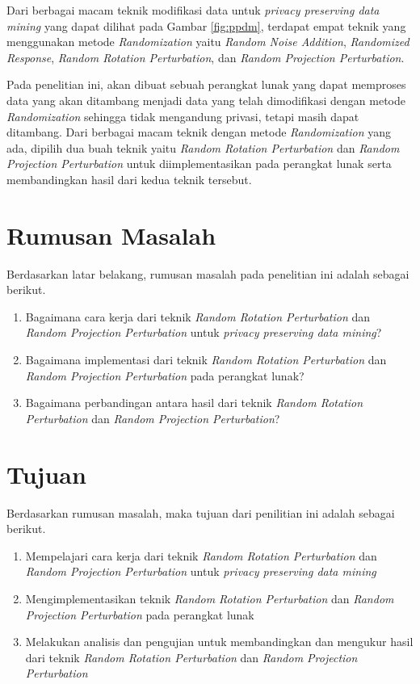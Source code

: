 Dari berbagai macam teknik modifikasi data untuk \textit{privacy preserving data mining} yang dapat dilihat pada Gambar \ref{fig:ppdm}, terdapat empat teknik yang menggunakan metode \textit{Randomization} yaitu \textit{Random Noise Addition}, \textit{Randomized Response}, \textit{Random Rotation Perturbation}, dan \textit{Random Projection Perturbation}.

Pada penelitian ini, akan dibuat sebuah perangkat lunak yang dapat memproses data yang akan ditambang menjadi data yang telah dimodifikasi dengan metode \textit{Randomization} sehingga tidak mengandung privasi, tetapi masih dapat ditambang. Dari berbagai macam teknik dengan metode \textit{Randomization} yang ada, dipilih dua buah teknik yaitu \textit{Random Rotation Perturbation} dan \textit{Random Projection Perturbation} untuk diimplementasikan pada perangkat lunak serta membandingkan hasil dari kedua teknik tersebut.

\section{Rumusan Masalah}
\label{sec:rumusan}
Berdasarkan latar belakang, rumusan masalah pada penelitian ini adalah sebagai berikut.
\begin{enumerate}
	\item Bagaimana cara kerja dari teknik \textit{Random Rotation Perturbation} dan \textit{Random Projection Perturbation} untuk \textit{privacy preserving data mining}?
	\item Bagaimana implementasi dari teknik \textit{Random Rotation Perturbation} dan \textit{Random Projection Perturbation} pada perangkat lunak?
	\item Bagaimana perbandingan antara hasil dari teknik \textit{Random Rotation Perturbation} dan \textit{Random Projection Perturbation}?
\end{enumerate}

\section{Tujuan}
\label{sec:tujuan}
Berdasarkan rumusan masalah, maka tujuan dari penilitian ini adalah sebagai berikut.
\begin{enumerate}
	\item Mempelajari cara kerja dari teknik \textit{Random Rotation Perturbation} dan \textit{Random Projection Perturbation} untuk \textit{privacy preserving data mining}
	\item Mengimplementasikan teknik \textit{Random Rotation Perturbation} dan \textit{Random Projection Perturbation} pada perangkat lunak
	\item Melakukan analisis dan pengujian untuk membandingkan dan mengukur hasil dari teknik \textit{Random Rotation Perturbation} dan \textit{Random Projection Perturbation}
\end{enumerate}

